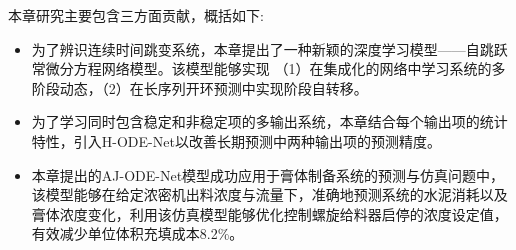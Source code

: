 本章研究主要包含三方面贡献，概括如下:
\begin{itemize}
    \item 为了辨识连续时间跳变系统，本章提出了一种新颖的深度学习模型——自跳跃常微分方程网络模型。该模型能够实现
    （1）在集成化的网络中学习系统的多阶段动态，（2）在长序列开环预测中实现阶段自转移。
    \item 为了学习同时包含稳定和非稳定项的多输出系统，本章结合每个输出项的统计特性，引入H-ODE-Net以改善长期预测中两种输出项的预测精度。
    \item 本章提出的AJ-ODE-Net模型成功应用于膏体制备系统的预测与仿真问题中，该模型能够在给定浓密机出料浓度与流量下，准确地预测系统的水泥消耗以及膏体浓度变化，利用该仿真模型能够优化控制螺旋给料器启停的浓度设定值，有效减少单位体积充填成本8.2\%。
\end{itemize}

